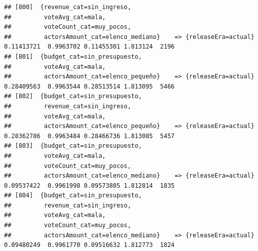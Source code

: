 \documentclass[
]{article}
\begin{document}
\begin{verbatim}
## [800]  {revenue_cat=sin_ingreso,                                                                                                
##         voteAvg_cat=mala,                                                                                                       
##         voteCount_cat=muy_pocos,                                                                                                
##         actorsAmount_cat=elenco_mediano}    => {releaseEra=actual}               0.11413721  0.9963702 0.11455301 1.813124  2196
## [801]  {budget_cat=sin_presupuesto,                                                                                             
##         voteAvg_cat=mala,                                                                                                       
##         actorsAmount_cat=elenco_pequeño}    => {releaseEra=actual}               0.28409563  0.9963544 0.28513514 1.813095  5466
## [802]  {budget_cat=sin_presupuesto,                                                                                             
##         revenue_cat=sin_ingreso,                                                                                                
##         voteAvg_cat=mala,                                                                                                       
##         actorsAmount_cat=elenco_pequeño}    => {releaseEra=actual}               0.28362786  0.9963484 0.28466736 1.813085  5457
## [803]  {budget_cat=sin_presupuesto,                                                                                             
##         voteAvg_cat=mala,                                                                                                       
##         voteCount_cat=muy_pocos,                                                                                                
##         actorsAmount_cat=elenco_mediano}    => {releaseEra=actual}               0.09537422  0.9961998 0.09573805 1.812814  1835
## [804]  {budget_cat=sin_presupuesto,                                                                                             
##         revenue_cat=sin_ingreso,                                                                                                
##         voteAvg_cat=mala,                                                                                                       
##         voteCount_cat=muy_pocos,                                                                                                
##         actorsAmount_cat=elenco_mediano}    => {releaseEra=actual}               0.09480249  0.9961770 0.09516632 1.812773  1824

\end{verbatim}
\end{document}
